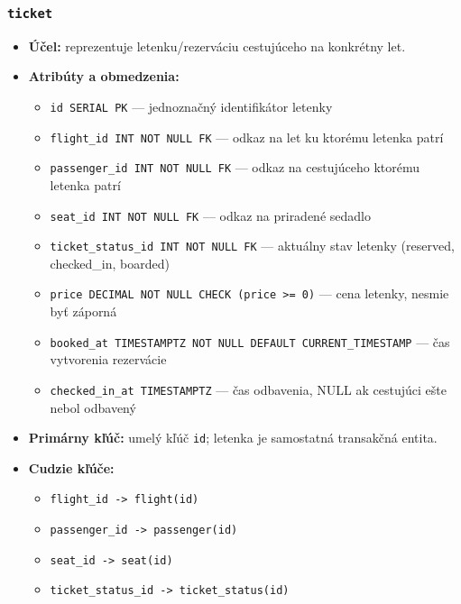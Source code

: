 \documentclass[11pt, a4paper]{article}
\begin{document}
\subsubsection*{\texttt{ticket}}
\begin{itemize}
    \item \textbf{Účel:} reprezentuje letenku/rezerváciu cestujúceho na konkrétny let.
    \item \textbf{Atribúty a obmedzenia:}
    \begin{itemize}
        \item \texttt{id SERIAL PK} --- jednoznačný identifikátor letenky
        \item \texttt{flight\_id INT NOT NULL FK} --- odkaz na let ku ktorému letenka patrí
        \item \texttt{passenger\_id INT NOT NULL FK} --- odkaz na cestujúceho ktorému letenka patrí
        \item \texttt{seat\_id INT NOT NULL FK} --- odkaz na priradené sedadlo
        \item \texttt{ticket\_status\_id INT NOT NULL FK} --- aktuálny stav letenky (reserved, checked\_in, boarded)
        \item \texttt{price DECIMAL NOT NULL CHECK (price >= 0)} --- cena letenky, nesmie byť záporná
        \item \texttt{booked\_at TIMESTAMPTZ NOT NULL DEFAULT CURRENT\_TIMESTAMP} --- čas vytvorenia rezervácie
        \item \texttt{checked\_in\_at TIMESTAMPTZ} --- čas odbavenia, NULL ak cestujúci ešte nebol odbavený
    \end{itemize}
    \item \textbf{Primárny kľúč:} umelý kľúč \texttt{id}; letenka je samostatná transakčná entita.
    \item \textbf{Cudzie kľúče:} 
        \begin{itemize}
            \item \texttt{flight\_id -> flight(id)}
            \item \texttt{passenger\_id -> passenger(id)}
            \item \texttt{seat\_id -> seat(id)}
            \item \texttt{ticket\_status\_id -> ticket\_status(id)}
        \end{itemize}
\end{itemize}
\end{document}
